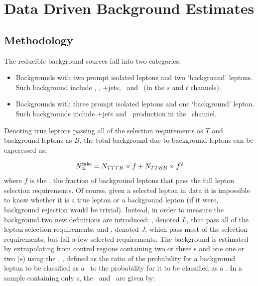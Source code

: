 \section{Data Driven Background Estimates}

\label{sec:ddbg}

\subsection{Methodology}

The reducible background sources fall into two categories:

\begin{itemize}
\item Backgrounds with two prompt isolated leptons and two `background' leptons. Such
background include \ZX, \Zgamma, \WW+jets, \ttbar\ and \singletop\ (in the
$s$ and $t$ channels).
\item Backgrounds with three prompt isolated leptons and one `background'
lepton. Such backgrounds include \WZ+jets and \singletop\ production in the \Wt\
channel.
\end{itemize}

Denoting true leptons passing all of the selection requirements as $T$ and
background leptons as $B$, the total background due to background leptons can be
experessed as:

\begin{equation}
N_{4l}^{\rm fake} = N_{TTTB} \times f + N_{TTBB} \times f^{2}
\label{eqn:bg-4l-true}
\end{equation}
where $f$ is the \frate, the fraction of background leptons that pass the full lepton selection
requirements. Of course, given a selected lepton in data it is impossible to
know whether it is a true lepton or a background lepton (if it were, background
rejection would be trivial). Instead, in order to measure the background 
two new definitions are introduced: \intro{\sellep s}, denoted $L$, that
pass all of the lepton selection requirements; and ,
denoted $J$, which
pass most of the selection requirements, but fail a few selected requirements.
The background is estimated by extrapolating from control regions containing
two or three \sellep s and one one or two \lljet (s) using the
\intro{\ffactor}, \FF, defined as the ratio of the probability for a background lepton to be
classified as a \sellep\ to the probability for it to be classified as a \lljet.
In a sample containing only \bglep s, the \frate\ and \ffactor\ are given by: 

